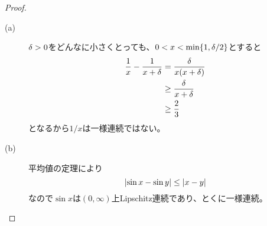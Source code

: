 \newpage

\subsubsection{}%
\begin{proof} ${}$
  \begin{description}
    \item[(a)] ${\delta} > 0$をどんなに小さくとっても、$0 < x < \min\{1, {\delta}/2 \}$とすると
    \begin{align*}
      \frac{1}{x} - \frac{1}{x + {\delta}} &= \frac{ {\delta} }{ x (x + {\delta}) } \\
      &\geq \frac{ {\delta} }{ x + {\delta} } \\
      &\geq \frac{2}{3}
    \end{align*}
    となるから$1/x$は一様連続ではない。
    \item[(b)] 平均値の定理により
    \[
    \left \lvert  \sin x - \sin y  \right \rvert \leq \left \lvert  x -y  \right \rvert
    \]
    なので$\sin x$は$(0,\infty)$上Lipschitz連続であり、とくに一様連続。
  \end{description}
\end{proof}

